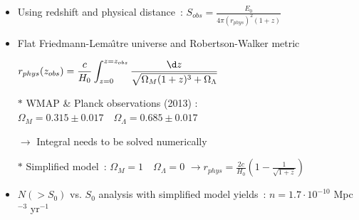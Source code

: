\Tr
\onecolumn

\begin{itemize}
\item Using redshift and physical distance~:
      $\displaystyle S_{obs}=\frac{E_{0}}{4\pi (r_{phys})^{2}(1+z)}$\\[1mm]
\item Flat Friedmann-Lema\^{\i}tre universe and Robertson-Walker metric\\[1mm]
\item[] $\displaystyle r_{phys}(z_{obs})=\frac{c}{H_{0}}
        \int_{z=0}^{z=z_{obs}} \frac{\d z}{\sqrt{\Omega_{M}(1+z)^{3}+\Omega_{\Lambda}}}$\\[1mm]
\item[$\ast$] WMAP \& Planck observations (2013) : $\Omega_{M}=0.315 \pm 0.017 \quad \Omega_{\Lambda}=0.685 \pm 0.017$
\item[] $\rightarrow$ Integral needs to be solved numerically
\item[$\ast$] Simplified model~: $\Omega_{M}=1 \quad \Omega_{\Lambda}=0$
              $\displaystyle \rightarrow r_{phys}=\frac{2c}{H_{0}}\left( 1-\frac{1}{\sqrt{1+z}} \right)$\\[1mm]
\item $N(>S_{0})$ vs. $S_{0}$ analysis with simplified model yields~:
      $n=1.7 \cdot 10^{-10}$ Mpc$^{-3}$ yr$^{-1}$
\end{itemize}
